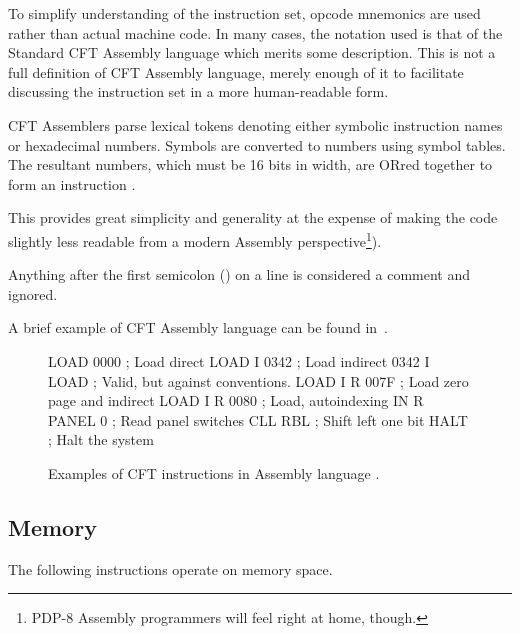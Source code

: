 To simplify understanding of the instruction set, opcode mnemonics are
used rather than actual machine code. In many cases, the notation used
is that of the Standard CFT Assembly language which merits some
description. This is not a full definition of CFT Assembly language,
merely enough of it to facilitate discussing the instruction set in
a more human-readable form.

CFT Assemblers parse lexical tokens denoting either symbolic
instruction names or hexadecimal numbers. Symbols are converted to
numbers using symbol tables. The resultant numbers, which must be 16
bits in width, are ORred together to form an instruction%
.

This provides great simplicity and generality at the expense of making
the code slightly less readable from a modern Assembly
perspective\footnote{PDP-8 Assembly programmers will feel right at
  home, though.}).

Anything after the first semicolon (\asm{;}) on a line is considered a comment
and ignored.

A brief example of CFT Assembly language can be found in~.

\begin{figure}
\small
\begin{cftasmcode}
LOAD 0000     ; Load direct
LOAD I 0342   ; Load indirect
0342 I LOAD   ; Valid, but against conventions.
LOAD I R 007F ; Load zero page and indirect
LOAD I R 0080 ; Load, autoindexing
IN R PANEL 0  ; Read panel switches
CLL RBL       ; Shift left one bit
HALT          ; Halt the system
\end{cftasmcode}
\caption{\label{fig-asm}Examples of CFT instructions in Assembly language .}
\end{figure}

\subsection{Memory}

The following instructions operate on memory space.

